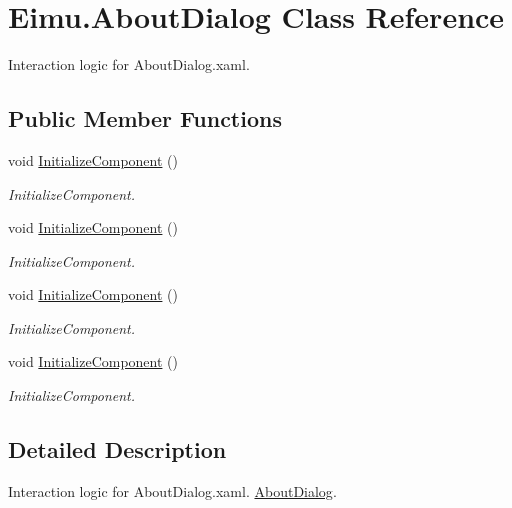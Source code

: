 \hypertarget{class_eimu_1_1_about_dialog}{
\section{Eimu.AboutDialog Class Reference}
\label{class_eimu_1_1_about_dialog}
}


Interaction logic for AboutDialog.xaml.  


\subsection*{Public Member Functions}
\begin{DoxyCompactItemize}
\item 
void \hyperlink{class_eimu_1_1_about_dialog_a5f60778fc8fe0adca240b953e10d77e6}{InitializeComponent} ()
\begin{DoxyCompactList}\small\item\em InitializeComponent. \item\end{DoxyCompactList}\item 
void \hyperlink{class_eimu_1_1_about_dialog_a5f60778fc8fe0adca240b953e10d77e6}{InitializeComponent} ()
\begin{DoxyCompactList}\small\item\em InitializeComponent. \item\end{DoxyCompactList}\item 
void \hyperlink{class_eimu_1_1_about_dialog_a5f60778fc8fe0adca240b953e10d77e6}{InitializeComponent} ()
\begin{DoxyCompactList}\small\item\em InitializeComponent. \item\end{DoxyCompactList}\item 
void \hyperlink{class_eimu_1_1_about_dialog_a5f60778fc8fe0adca240b953e10d77e6}{InitializeComponent} ()
\begin{DoxyCompactList}\small\item\em InitializeComponent. \item\end{DoxyCompactList}\end{DoxyCompactItemize}


\subsection{Detailed Description}
Interaction logic for AboutDialog.xaml. \hyperlink{class_eimu_1_1_about_dialog}{AboutDialog}.

